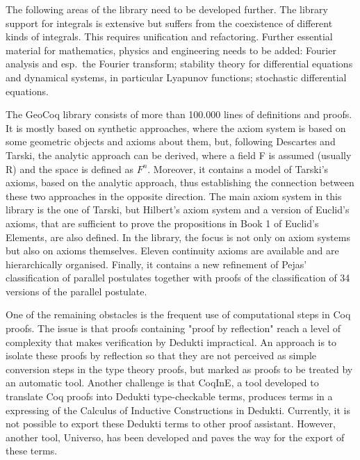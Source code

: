 \begin{workpackage}[id=libraries,type=RTD,wphases=1-48,
  short={Large libraries},%
  title={Large libraries},
  activity=na,
  lead=Tum,
  StrRM=18,
  ChaRM=12,
  TumRM=27]
\begin{tasklist}
\begin{task}[
  id=isaAnalysisProb,
  title=The Isabelle Analysis \& Probability Theory library,
  shorttitle=Isa. A\&P,
  lead=Tum,
  TumRM=24,
  wphases=1-24]
The following areas of the library need to be developed further. The
library support for integrals is extensive but suffers from the
coexistence of different kinds of integrals. This requires unification
and refactoring. Further essential material for mathematics, physics
and engineering needs to be added: Fourier
analysis and esp.\ the Fourier transform; stability theory for
differential equations and dynamical systems, in particular Lyapunov
functions; stochastic differential equations.
\end{task}

\begin{task}[
  id=geocoq,
  title=The GeoCoq library,
  shorttitle=GeoCoq,
  lead=Str,
  StrRM=18,
  wphases=1-18]
%
The GeoCoq library consists of more than 100.000 lines of definitions
and proofs. It is mostly based on synthetic approaches, where the
axiom system is based on some geometric objects and axioms about them,
but, following Descartes and Tarski, the analytic approach can be
derived, where a field F is assumed (usually R) and the space is
defined as $F^n$. Moreover, it contains a model of Tarski's axioms,
based on the analytic approach, thus establishing the connection
between these two approaches in the opposite direction. The main axiom
system in this library is the one of Tarski, but Hilbert's axiom
system and a version of Euclid's axioms, that are sufficient to prove the
propositions in Book 1 of Euclid's Elements, are also defined. In the
library, the focus is not only on axiom systems but also on axioms
themselves. Eleven continuity axioms are available and are
hierarchically organised. Finally, it contains a new refinement of
Pejas’ classification of parallel postulates together with proofs of
the classification of 34 versions of the parallel postulate.

One of the remaining obstacles is the frequent use of computational steps in Coq proofs. The issue is that proofs containing "proof by reflection" reach a level of complexity that makes verification by Dedukti impractical. An approach is to isolate these proofs by reflection so that they are not perceived as simple conversion steps in the type theory proofs, but marked as proofs to be treated by an automatic tool. Another challenge is that CoqInE, a tool developed to translate Coq proofs into Dedukti type-checkable terms, produces terms in a expressing of the Calculus of Inductive Constructions in Dedukti. Currently, it is not possible to export these Dedukti terms to other proof assistant. However, another tool, Universo, has been developed and paves the way for the export of these terms.
\end{task}


\end{tasklist}
\end{workpackage}
